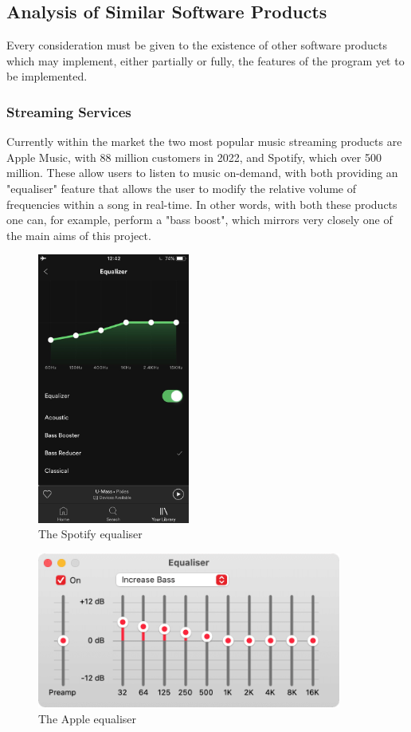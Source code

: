 \documentclass{article}
\begin{document}
	\subsection{Analysis of Similar Software Products}
	Every consideration must be given to the existence of other software products which may implement, either partially or fully, the features of the program yet to be implemented.
	
	\subsubsection{Streaming Services}
	Currently within the market the two most popular music streaming products are Apple Music, with 88 million customers in 2022, and Spotify, which over 500 million. These allow users to listen to music on-demand, with both providing an "equaliser" feature that allows the user to modify the relative volume of frequencies within a song in real-time. In other words, with both these products one can, for example, perform a "bass boost", which mirrors very closely one of the main aims of this project.
	
	\begin{figure}[H]
		\caption{The Spotify equaliser}
		\begin{center}
			\includegraphics[width=5cm]{spotify equaliser}
		\end{center}
	\end{figure}
	
	\begin{figure}[H]
		\caption{The Apple equaliser}
		\begin{center}
			\includegraphics[width=10cm]{apple equaliser}
		\end{center}
	\end{figure}
	
\end{document}
